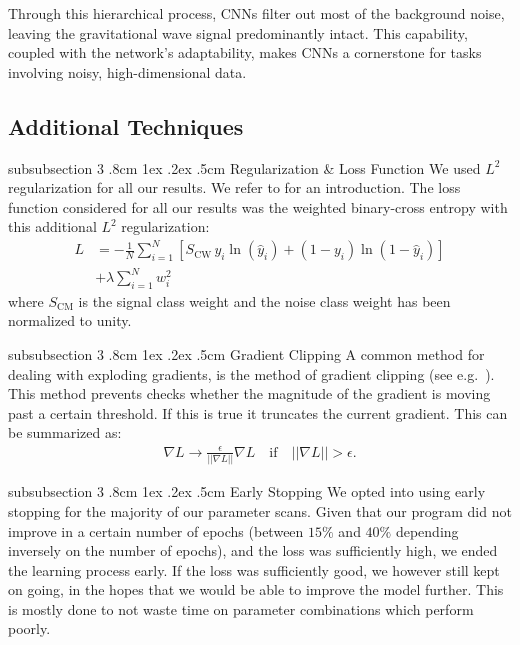 \documentclass[%
reprint,
amsmath,amssymb,
aps,
]{revtex4-2}
\makeatletter
\renewcommand{\subsubsection}{%
	\@startsection
	{subsubsection}%
	{3}%
	{\z@}%
	{.8cm \@plus1ex \@minus .2ex}%
	{.5cm}%
	{\normalfont\small\centering}%
}
\makeatother
\begin{document}
Through this hierarchical process, CNNs filter out most of the background noise, leaving the gravitational wave signal predominantly intact. This capability, coupled with the network's adaptability, makes CNNs a cornerstone for tasks involving noisy, high-dimensional data.




\subsection{Additional Techniques}
\subsubsection{Regularization \& Loss Function}
We used $L^2$ regularization for all our results. We refer to \cite{project1} for an introduction. The loss function considered for all our results was the weighted binary-cross entropy with this additional $L^2$ regularization:
\begin{align}	
	L&=-\frac1N\sum_{i=1}^N\left[S_\text{CW}\,y_i\ln(\hat{y}_i)+(1-y_i)\ln(1-\hat{y}_i)\right]\nonumber\\
	&+\lambda\sum_{i=1}^Nw_i^2 \label{eq:L2_paramater}
\end{align}
where $S_{\text{CM}}$ is the signal class weight and the noise class weight has been normalized to unity.

\subsubsection{Gradient Clipping}
A common method for dealing with exploding gradients, is the method of gradient clipping (see e.g.~\cite{Goodfellow-et-al-2016}). This method prevents checks whether the magnitude of the gradient is moving past a certain threshold. If this is true it truncates the current gradient. This can be summarized as:
\begin{align}	\label{eq:clipping}
	\nabla L \rightarrow \frac{\epsilon}{||\nabla L||}\nabla L\quad\text{if}\quad||\nabla L|| > \epsilon.
\end{align}

\subsubsection{Early Stopping}
We opted into using early stopping for the majority of our parameter scans. Given that our program did not improve in a certain number of epochs (between $15\%$ and $40\%$ depending inversely on the number of epochs), and the loss was sufficiently high, we ended the learning process early. If the loss was sufficiently good, we however still kept on going, in the hopes that we would be able to improve the model further. This is mostly done to not waste time on parameter combinations which perform poorly. 
\end{document}
